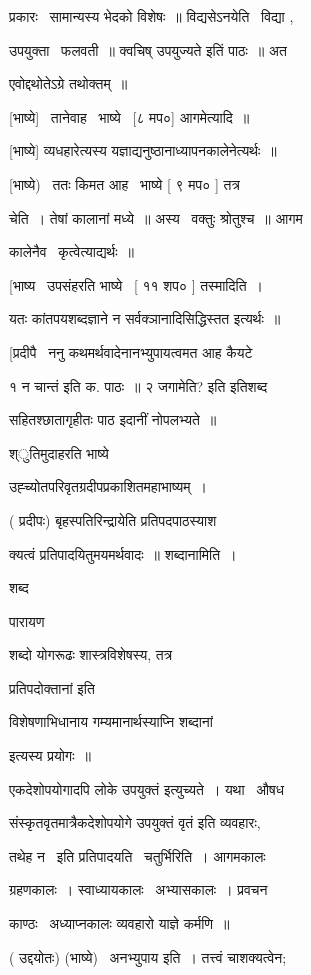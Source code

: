 \documentclass[11pt, openany]{book}
\begin{document}
प्रकारः \textendash\ सामान्यस्य भेदको विशेषः~॥ विद्यसेऽनयेति \textendash\ विद्या , 

उपयुक्ता \textendash\ फलवती~॥ क्वचिष् {\qt उपयुज्यते} इतिं पाठः~॥ अत 

एवोद्दथोतेऽग्रे तथोक्तम्~॥ 

[भाष्ये] \textendash\ तानेवाह \textendash\ भाष्ये \textendash\ [८ मप०] आगमेत्यादि~॥ 

[भाष्ये] व्यधहारेत्यस्य यज्ञाद्यनुष्ठानाध्यापनकालेनेत्यर्थः~॥ 

[भाष्ये) \textendash\ ततः किमत आह \textendash\ भाष्ये [ ९ मप० ] तत्र 

चेति~। तेषां कालानां मध्ये~॥ अस्य \textendash\ वक्तुः श्रोतुश्च~॥ आगम \textendash\ 

कालेनैव \textendash\ कृत्वेत्याद्यर्थः~॥ 

[भाष्य \textendash\ उपसंहरति भाष्ये \textendash\ [ ११ शप० ] तस्मादिति~। 

यतः कांतपयशब्दज्ञाने न सर्वक्ञानादिसिद्धिस्तत इत्यर्थः~॥ 

[प्रदीपै \textendash\ ननु कथमर्थवादेनानभ्युपायत्वमत आह कैयटे 

१ {\qt न चान्तं इति क. पाठः~॥} २ जगामेति? इति इतिशब्द \textendash\ 

सहितश्छातागृहीतः पाठ इदानीं नोपलभ्यते~॥ 

श्ुतिमुदाहरति भाष्ये \textendash\ 

उह्च्योतपरिवृतग्रदीपप्रकाशितमहाभाष्यम्~। 

( प्रदीपः) बृहस्पतिरिन्द्रायेति प्रतिपदपाठस्याश \textendash\ 

क्यत्वं प्रतिपादयितुमयमर्थवादः~॥ शब्दानामिति~। {\qt शब्द \textendash\ 

पारायण}शब्दो योगरूढः शास्त्रविशेषस्य, तत्र {\qt प्रतिपदोक्तानां इति 

विशेषणाभिधानाय गम्यमानार्थस्याप्नि शब्दानां}इत्यस्य प्रयोगः~॥ 

एकदेशोपयोगादपि लोके {\qt उपयुक्तं} इत्युच्यते~। यथा \textendash\ औषध \textendash\ 

संस्कृतवृतमात्रैकदेशोपयोगे {\qt उपयुक्तं वृतं} इति व्यवहारः, 

तथेह न \textendash\ इति प्रतिपादयति \textendash\ चतुर्भिरिति~। आगमकालः \textendash\ 

ग्रहणकालः~। स्वाध्यायकालः \textendash\ अभ्यासकालः~। प्रवचन \textendash\ 

काण्ठः \textendash\ अध्याप्नकालः व्यवहारो याज्ञे कर्मणि~॥ 

( उद्दयोतः) (भाष्ये) \textendash\ अनभ्युपाय इति~। तत्त्वं चाशक्यत्वेन; 
\end{document}
